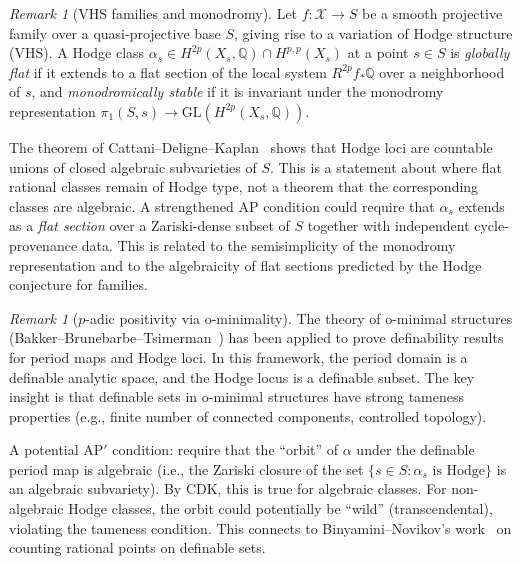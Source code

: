 \documentclass[aps,prd,twocolumn,superscriptaddress,nofootinbib]{revtex4-2}
\theoremstyle{definition}
\theoremstyle{remark}
\newtheorem{remark}[theorem]{Remark}
\begin{document}
\begin{remark}[VHS families and monodromy]
\label{rem:vhs-monodromy}
Let $f: \mathcal{X} \to S$ be a smooth projective family over a quasi-projective base $S$, giving rise to a variation of Hodge structure (VHS). A Hodge class $\alpha_s \in H^{2p}(X_s, \mathbb{Q}) \cap H^{p,p}(X_s)$ at a point $s \in S$ is \textit{globally flat} if it extends to a flat section of the local system $R^{2p}f_*\mathbb{Q}$ over a neighborhood of $s$, and \textit{monodromically stable} if it is invariant under the monodromy representation $\pi_1(S, s) \to \mathrm{GL}(H^{2p}(X_s, \mathbb{Q}))$.

The theorem of Cattani--Deligne--Kaplan~\cite{CattaniDeligneKaplan1995} shows that Hodge loci are countable unions of closed algebraic subvarieties of $S$. This is a statement about where flat rational classes remain of Hodge type, not a theorem that the corresponding classes are algebraic. A strengthened AP condition could require that $\alpha_s$ extends as a \textit{flat section} over a Zariski-dense subset of $S$ together with independent cycle-provenance data. This is related to the semisimplicity of the monodromy representation and to the algebraicity of flat sections predicted by the Hodge conjecture for families.
\end{remark}

\begin{remark}[$p$-adic positivity via o-minimality]
\label{rem:o-minimality}
The theory of o-minimal structures (Bakker--Brunebarbe--Tsimerman~\cite{BBT2023}) has been applied to prove definability results for period maps and Hodge loci. In this framework, the period domain is a definable analytic space, and the Hodge locus is a definable subset. The key insight is that definable sets in o-minimal structures have strong tameness properties (e.g., finite number of connected components, controlled topology).

A potential AP$'$ condition: require that the ``orbit'' of $\alpha$ under the definable period map is algebraic (i.e., the Zariski closure of the set $\{s \in S : \alpha_s \text{ is Hodge}\}$ is an algebraic subvariety). By CDK, this is true for algebraic classes. For non-algebraic Hodge classes, the orbit could potentially be ``wild'' (transcendental), violating the tameness condition. This connects to Binyamini--Novikov's work~\cite{BinyaminiNovikov2017} on counting rational points on definable sets.
\end{remark}
\end{document}
